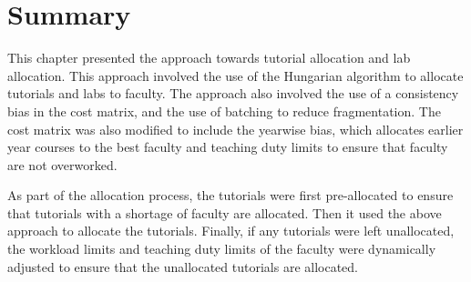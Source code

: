 \begin{table}[H]
  \centering
  \caption{Impact of Dynamic Adjustment of Limits on Labs}
  \label{tab:dynamic_adjustment_labs}
\end{table}

\section{Summary}

This chapter presented the approach towards tutorial allocation and lab allocation. This approach involved the use of the Hungarian algorithm to allocate tutorials and labs to faculty. The approach also involved the use of a consistency bias in the cost matrix, and the use of batching to reduce fragmentation. The cost matrix was also modified to include the yearwise bias, which allocates earlier year courses to the best faculty and teaching duty limits to ensure that faculty are not overworked.

As part of the allocation process, the tutorials were first pre-allocated to ensure that tutorials with a shortage of faculty are allocated. Then it used the above approach to allocate the tutorials. Finally, if any tutorials were left unallocated, the workload limits and teaching duty limits of the faculty were dynamically adjusted to ensure that the unallocated tutorials are allocated.

